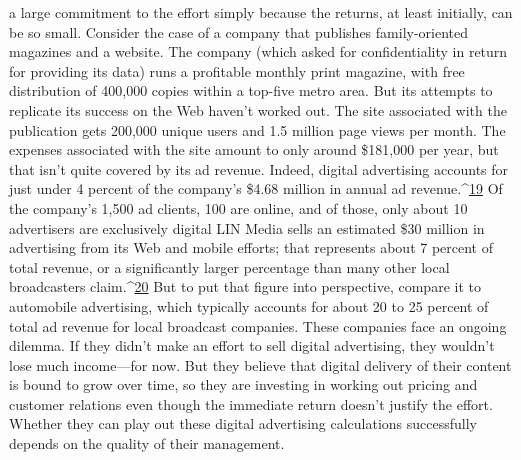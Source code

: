 a large commitment to the effort simply because the returns, at least initially,
can be so small. Consider the case of a company that publishes family-oriented
magazines and a website. The company (which asked for confidentiality in return
for providing its data) runs a profitable monthly print magazine, with free
distribution of 400,000 copies within a top-five metro area. But its attempts to
replicate its success on the Web haven’t worked out. The site associated with the
publication gets 200,000 unique users and 1.5 million page views per month.
The expenses associated with the site amount to only around \$181,000 per year,
but that isn’t quite covered by its ad revenue. Indeed, digital advertising accounts
for just under 4 percent of the company’s \$4.68 million in annual ad revenue.^{\href{#endnotes-ch9}{19}}
Of the company’s 1,500 ad clients, 100 are online, and of those, only about 10
advertisers are exclusively digital
LIN Media sells an estimated \$30 million in advertising from its Web and mobile
efforts; that represents about 7 percent of total revenue, or a significantly larger
percentage than many other local broadcasters claim.^{\href{#endnotes-ch9}{20}} But to put that figure
into perspective, compare it to automobile advertising, which typically accounts
for about 20 to 25 percent of total ad revenue for local broadcast companies.
These companies face an ongoing dilemma. If they didn’t make an effort to
sell digital advertising, they wouldn’t lose much income—for now. But they believe
that digital delivery of their content is bound to grow over time, so they
are investing in working out pricing and customer relations even though the immediate
return doesn’t justify the effort. Whether they can play out these digital
advertising calculations successfully depends on the quality of their management.

